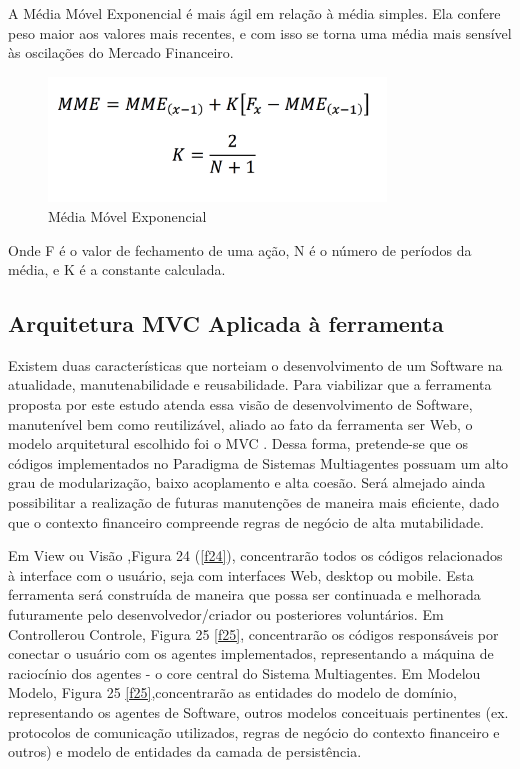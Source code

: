A Média Móvel Exponencial é mais ágil em relação à média simples. Ela confere peso maior aos valores mais recentes, e com isso se torna uma média mais sensível às oscilações do Mercado Financeiro.

\begin{figure}[h]
\centering
\label{f23}
\includegraphics[width=0.8\textwidth]{figuras/f23}
\caption{Média Móvel Exponencial}
\end{figure}


Onde F é o valor de fechamento de uma ação, N é o número de períodos da média, e K é a constante calculada.

\subsection{Arquitetura MVC Aplicada à ferramenta}

Existem duas características que norteiam o desenvolvimento de um Software na atualidade, manutenabilidade e reusabilidade. Para viabilizar que a ferramenta proposta por este estudo atenda essa visão de desenvolvimento de Software, manutenível bem como reutilizável, aliado ao fato da ferramenta ser Web, o modelo arquitetural escolhido foi o MVC \cite{krasner1988}. Dessa forma, pretende-se que os códigos implementados no Paradigma de Sistemas Multiagentes possuam um alto grau de modularização, baixo acoplamento e alta coesão. Será almejado ainda possibilitar a realização de futuras manutenções de maneira mais eficiente, dado que o contexto financeiro compreende regras de negócio de alta mutabilidade. 

Em View ou Visão ,Figura 24 (\ref{f24}), concentrarão todos os códigos relacionados à interface com o usuário, seja com interfaces Web, desktop ou mobile. Esta ferramenta será construída de maneira que possa ser continuada e melhorada futuramente pelo desenvolvedor/criador ou posteriores voluntários. Em Controllerou Controle, Figura 25 \ref{f25}, concentrarão os códigos responsáveis por conectar o usuário com os agentes implementados, representando a máquina de raciocínio dos agentes - o core central do Sistema Multiagentes. Em Modelou Modelo, Figura 25 \ref{f25},concentrarão as entidades do modelo de domínio, representando os agentes de Software, outros modelos conceituais pertinentes (ex. protocolos de comunicação utilizados, regras de negócio do contexto financeiro e outros) e modelo de entidades da camada de persistência.

